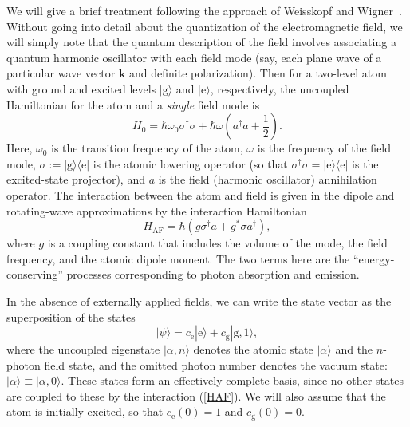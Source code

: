 \documentclass[aps,twocolumn,superscriptaddress,footinbib,floatfix,showpacs]{revtex4}
\def\ket#1{|{#1}\rangle}
\def\bra#1{\langle{#1}|}
\def\eket{\ket{\mathrm{e}}}
\def\gket{\ket{\mathrm{g}}}
\def\ebra{\bra{\mathrm{e}}}
\def\goneket{\ket{\mathrm{g}, 1}}
\def\HAF{H_\mathrm{\scriptscriptstyle AF}}
\def\psiket{{| \psi \rangle}}
\def\ce{c_\mathrm{e}}
\def\cg{c_\mathrm{g}}
\begin{document}
We will give a brief treatment following the approach of 
Weisskopf and Wigner~\cite{Weisskopf30, Scully97, Milonni94}.
Without going into detail about the quantization of the electromagnetic
field, we will simply note that the quantum description of the 
field involves associating a quantum harmonic oscillator with each field mode 
(say, each plane wave of a particular wave vector $\mathbf{k}$ and
definite polarization).  Then for a two-level atom with 
ground and excited levels $\gket$ and $\eket$, respectively, the
uncoupled Hamiltonian for the atom and a \textit{single} field mode
is
\begin{equation}
  H_0 = \hbar\omega_{0}\sigma^\dagger\sigma
       +\hbar\omega
     \left(a^\dagger a+\frac{1}{2}\right).
\end{equation}
Here, $\omega_0$ is the transition frequency of the atom, 
$\omega$ is the frequency of the field mode,
$\sigma:=\gket\ebra$ is the atomic lowering operator (so that
$\sigma^\dagger\sigma=\eket\ebra$ is the excited-state projector), and
$a$ is the field (harmonic oscillator) annihilation operator.
The interaction between the atom and field is given in the dipole
and rotating-wave approximations by the interaction Hamiltonian
\begin{equation}
  \HAF =\hbar\left(g\sigma^\dagger a+g^*\sigma a^\dagger\right),
  \label{HAF}
\end{equation}
where $g$ is a coupling constant that includes the volume of the mode,
the field frequency, and the atomic dipole moment.
The two terms here are the ``energy-conserving'' processes
corresponding to photon absorption and emission.

In the absence of externally applied fields,
we can write the state vector as the superposition of the states
\begin{equation}
  \psiket = \ce \eket + \cg\goneket,
  \label{superpos}
\end{equation}
where the uncoupled eigenstate $\ket{\alpha, n}$ denotes the atomic state
$\ket\alpha$ and the $n$-photon field state, and the omitted photon number
denotes the vacuum state:
$\ket{\alpha}\equiv\ket{\alpha, 0}$.
These states form an effectively complete basis,
since no other states are coupled to these by
the interaction (\ref{HAF}).
We will also assume that the atom is initially excited, so that
$\ce(0)=1$ and $\cg(0)=0$.
\end{document}
